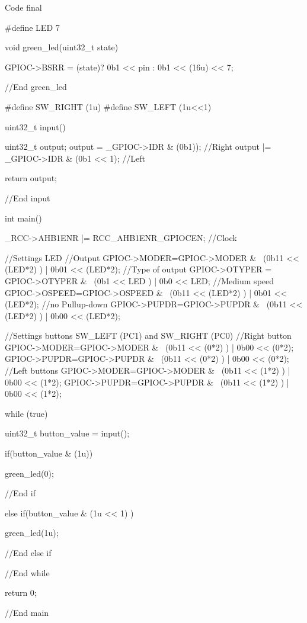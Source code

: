\documentclass[12pt]{report}
\begin{document}
\begin{Cpp}{Code final}

  #define LED 7
  
  void green_led(uint32_t state){

    GPIOC->BSRR = (state)? 0b1 << pin : 0b1 << (16u) << 7;

  }//End green_led

  #define SW_RIGHT (1u)
  #define SW_LEFT (1u<<1)

  uint32_t input(){

    uint32_t output;
    output = _GPIOC->IDR & (0b1)); //Right
    output |= _GPIOC->IDR & (0b1 << 1); //Left
  
    return output;

  }//End input

  int main(){
  
    _RCC->AHB1ENR |= RCC_AHB1ENR_GPIOCEN; //Clock

    //Settings LED
    //Output
    GPIOC->MODER=GPIOC->MODER & ~(0b11 << (LED*2) ) | 0b01 << (LED*2); 
    //Type of output
    GPIOC->OTYPER = GPIOC->OTYPER & ~(0b1 << LED ) | 0b0 << LED; 
    //Medium speed
    GPIOC->OSPEED=GPIOC->OSPEED & ~(0b11 << (LED*2) ) | 0b01 << (LED*2);
    //no Pullup-down
    GPIOC->PUPDR=GPIOC->PUPDR & ~(0b11 << (LED*2) ) | 0b00 << (LED*2);


    //Settings buttons SW_LEFT (PC1) and SW_RIGHT (PC0)
    //Right button
    GPIOC->MODER=GPIOC->MODER & ~(0b11 << (0*2) ) | 0b00 << (0*2); 
    GPIOC->PUPDR=GPIOC->PUPDR & ~(0b11 << (0*2) ) | 0b00 << (0*2);
    //Left buttons
    GPIOC->MODER=GPIOC->MODER & ~(0b11 << (1*2) ) | 0b00 << (1*2); 
    GPIOC->PUPDR=GPIOC->PUPDR & ~(0b11 << (1*2) ) | 0b00 << (1*2);
  
    while (true){
  
      uint32_t button_value = input();
  
      if(button_value & (1u)){
  
        green_led(0);
  
      }//End if
  
      else if(button_value & (1u << 1) ){
      
        green_led(1u);

      }//End else if

    }//End while

  return 0;
  }//End main

\end{Cpp}
\end{document}
